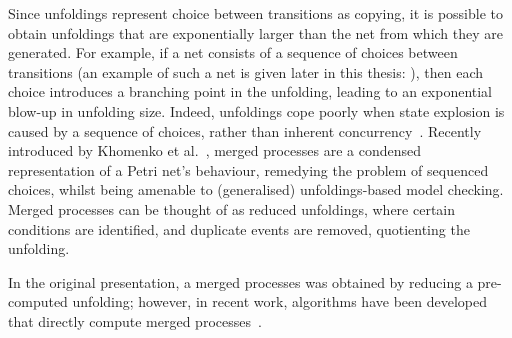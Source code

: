 Since unfoldings represent choice between transitions as copying, it is
possible to obtain unfoldings that are exponentially larger than the net from
which they are generated. For example, if a net consists of a sequence of
choices between transitions (an example of such a net is given later in
this thesis: ), then each choice introduces
a branching point in the unfolding, leading to an exponential blow-up in
unfolding size. Indeed, unfoldings cope poorly when state explosion is caused
by a sequence of choices, rather than inherent concurrency~\cite{Khomenko2006}.
Recently introduced by {Khomenko et al.}~\cite{Khomenko2005, Khomenko2006},
merged processes are a condensed representation of a Petri net's behaviour,
remedying the problem of sequenced choices, whilst being amenable to
(generalised) unfoldings-based model checking. Merged processes can be thought
of as reduced unfoldings, where certain conditions are identified, and
duplicate events are removed, quotienting the unfolding.

In the original presentation, a merged processes was obtained by reducing a
pre-computed unfolding; however, in recent work, algorithms have been developed
that directly compute merged processes~\cite{Khomenko2011}.
